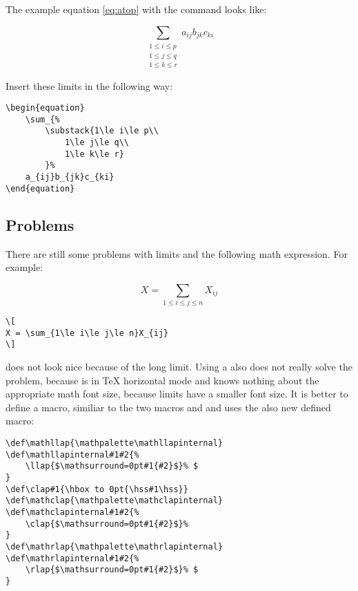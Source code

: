 \begin{table}[htb]
The example equation \vref{eq:atop} with the  command
looks like:

\begin{equation}\label{eq:multlimits}
\sum_{\substack{1\le i\le p\\
1\le j\le q\\
1\le k\le r}
}a_{ij}b_{jk}c_{ki}
\end{equation}


Insert these limits in the following way:
\begin{lstlisting}
\begin{equation}
	\sum_{%
		\substack{1\le i\le p\\
			1\le j\le q\\
			1\le k\le r}
		}%
	a_{ij}b_{jk}c_{ki}
\end{equation}
\end{lstlisting}

\subsection{Problems}\label{subsec:ams-limits}

There are still some problems with limits and the following math
expression. For example:

\[
X = \sum_{1\le i\le j\le n}X_{ij}
\]
\begin{lstlisting}
\[
X = \sum_{1\le i\le j\le n}X_{ij}
\]
\end{lstlisting}

\noindent does not look nice because of the long limit. Using a
 also does not really solve the problem, because
 is in \TeX{} horizontal mode and knows nothing about
the appropriate math font size, because limits have a smaller font size.
It is better to define a  macro, similiar to the two
macros  and  and uses the also new defined  macro:

\begin{lstlisting}
\def\mathllap{\mathpalette\mathllapinternal}
\def\mathllapinternal#1#2{%
	\llap{$\mathsurround=0pt#1{#2}$}% $
}
\def\clap#1{\hbox to 0pt{\hss#1\hss}}
\def\mathclap{\mathpalette\mathclapinternal}
\def\mathclapinternal#1#2{%
	\clap{$\mathsurround=0pt#1{#2}$}%
}
\def\mathrlap{\mathpalette\mathrlapinternal}
\def\mathrlapinternal#1#2{%
	\rlap{$\mathsurround=0pt#1{#2}$}% $
}
\end{lstlisting}



\end{table}
